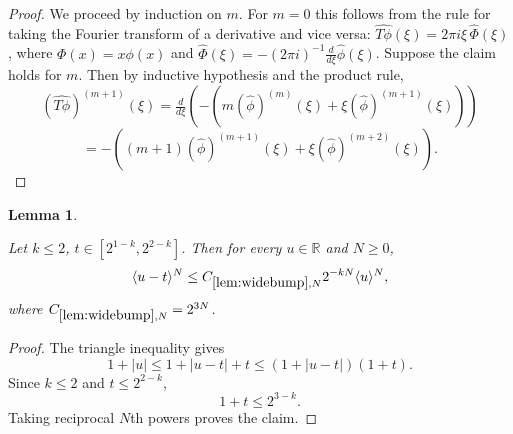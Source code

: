 \documentclass[12pt,reqno]{amsart}
\theoremstyle{plain}
\newtheorem{lemma}[theorem]{Lemma}
\numberwithin{equation}{section}
\theoremstyle{remark}
\newcommand{\uses}[1]{}
\newcommand{\usesdefs}[1]{}
\newcommand{\leanok}{}
\newcommand{\lean}[1]{}
\newcommand{\R}{{\mathbb R}}
\begin{document}
\begin{proof}
We proceed by induction on $m$.
For $m=0$ this follows from the rule for taking the Fourier transform of a derivative and vice versa:
$\widehat{T\phi}(\xi) = 2\pi i \xi\,\widehat{\Phi}(\xi)$,
where $\Phi(x)=x \phi(x)$ and $\widehat{\Phi}(\xi) = -(2\pi i)^{-1} \frac{d}{d\xi} \widehat{\phi}(\xi)$.
Suppose the claim holds for $m$. Then by inductive hypothesis and the product rule,
\[ (\widehat{T\phi})^{(m+1)}(\xi) = \tfrac{d}{d\xi} (-(m (\widehat{\phi})^{(m)}(\xi) + \xi (\widehat{\phi})^{(m+1)}(\xi))) \]
\[ = -((m+1) (\widehat{\phi})^{(m+1)}(\xi) + \xi (\widehat{\phi})^{(m+2)}(\xi)). \]
\end{proof}


\begin{lemma} \label{lem:widebump}\uses{}\usesdefs{bracket bump}
\lean{Auto.wideBump}
\leanok
Let $k \leq 2$, $t\in [2^{1-k}, 2^{2-k}]$. Then for every $u\in \R$ and $N\ge 0$,
\begin{equation}\label{auto:wide-bump-translation-bound}\langle u-t\rangle^{N} \le C_{\ref{lem:widebump},N} 2^{-kN}\langle u\rangle^{N},\end{equation}
where $C_{\ref{lem:widebump},N}=2^{3N}$.
\end{lemma}
\begin{proof}
The triangle inequality gives
\[
1+|u|\le1+|u-t|+t\le(1+|u-t|)(1+t).
\]
Since $k\le2$ and $t\le2^{2-k}$,
\[
1+t\le2^{3-k}.
\]
Taking reciprocal $N$th powers proves the claim.
\end{proof}
\end{document}
